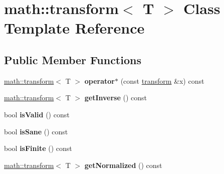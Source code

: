 \hypertarget{classmath_1_1transform}{
\section{math::transform$<$ T $>$ Class Template Reference}
\label{classmath_1_1transform}
}
\subsection*{Public Member Functions}
\begin{DoxyCompactItemize}
\item 
\hypertarget{classmath_1_1transform_a8f2846128cf62a71986cfc034fdecd1d}{
\hyperlink{classmath_1_1transform}{math::transform}$<$ T $>$ {\bfseries operator$\ast$} (const \hyperlink{classmath_1_1transform}{transform} \&x) const }
\label{classmath_1_1transform_a8f2846128cf62a71986cfc034fdecd1d}

\item 
\hypertarget{classmath_1_1transform_a752af6c338685af7b07bf6a9576df5fc}{
\hyperlink{classmath_1_1transform}{math::transform}$<$ T $>$ {\bfseries getInverse} () const }
\label{classmath_1_1transform_a752af6c338685af7b07bf6a9576df5fc}

\item 
\hypertarget{classmath_1_1transform_ac31f73479d89e0401f44b59b243ddacd}{
bool {\bfseries isValid} () const }
\label{classmath_1_1transform_ac31f73479d89e0401f44b59b243ddacd}

\item 
\hypertarget{classmath_1_1transform_a7a6602be4a1c9eb4fb20514c5eee965b}{
bool {\bfseries isSane} () const }
\label{classmath_1_1transform_a7a6602be4a1c9eb4fb20514c5eee965b}

\item 
\hypertarget{classmath_1_1transform_a92670298b2affc9daf52716076d6cbdc}{
bool {\bfseries isFinite} () const }
\label{classmath_1_1transform_a92670298b2affc9daf52716076d6cbdc}

\item 
\hypertarget{classmath_1_1transform_aa58656ac13280f5392f044981381f73f}{
\hyperlink{classmath_1_1transform}{math::transform}$<$ T $>$ {\bfseries getNormalized} () const }
\label{classmath_1_1transform_aa58656ac13280f5392f044981381f73f}

\end{DoxyCompactItemize}

